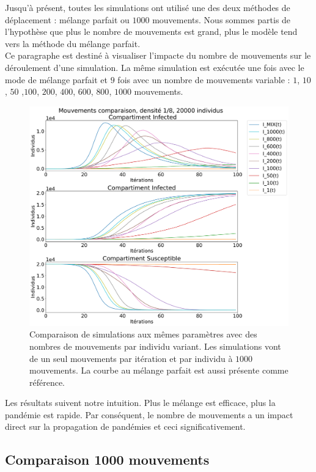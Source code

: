 Jusqu'à présent, toutes les simulations ont utilisé une des deux méthodes de déplacement : mélange parfait ou $1000$ mouvements. Nous sommes partis de l'hypothèse que plus le nombre de mouvements est grand, plus le modèle tend vers la méthode du mélange parfait.\\

Ce paragraphe est destiné à visualiser l'impacte du nombre de mouvements sur le déroulement d'une simulation. La même simulation est exécutée une fois avec le mode de mélange parfait et $9$ fois avec un nombre de mouvements variable : $1$, $10$, $50$ ,$100$, $200$, $400$, $600$, $800$, $1000$ mouvements.

\begin{figure}[h]
	\centering
	\captionsetup{justification=centering}
	\includegraphics[width=.8\textwidth]{Images/SIR_mouvements_variables.pdf}
	\caption[Mouvements variable : SIR]{Comparaison de simulations aux mêmes paramètres avec des nombres de mouvements par individu variant. Les simulations vont de un seul mouvements par itération et par individu à $1000$ mouvements. La courbe au mélange parfait est aussi présente comme référence.}
\end{figure}

Les résultats suivent notre intuition. Plus le mélange est efficace, plus la pandémie est rapide. Par conséquent, le nombre de mouvements a un impact direct sur la propagation de pandémies et ceci significativement. 

\newpage

\subsection{Comparaison 1000 mouvements}

